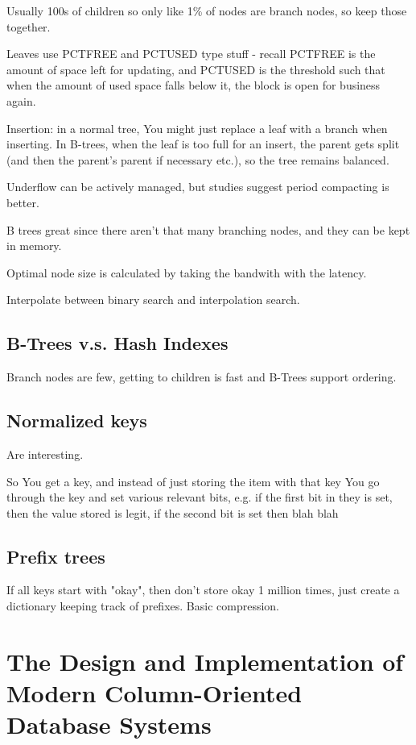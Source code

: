 \documentclass{article}
\begin{document}
	Usually 100s of children so only like 1\% of nodes are branch nodes, so keep those together.
	
	Leaves use PCTFREE and PCTUSED type stuff - recall PCTFREE is the amount of space left for updating, and PCTUSED is the threshold such that when the amount of used space falls below it, the block is open for business again.

	Insertion: in a normal tree, You might just replace a leaf with a branch when inserting. In B-trees, when the leaf is too full for an insert, the parent gets split (and then the parent's parent if necessary etc.), so the tree remains balanced.
	
	Underflow can be actively managed, but studies suggest period compacting is better.
	
	B trees great since there aren't that many branching nodes, and they can be kept in memory.
	
	Optimal node size is calculated by taking the bandwith with the latency.
	
	Interpolate between binary search and interpolation search.
	
	\subsection{B-Trees v.s. Hash Indexes}
	
		Branch nodes are few, getting to children is fast and B-Trees support ordering.
		
	\subsection{Normalized keys}
	
		Are interesting.
		
		So You get a key, and instead of just storing the item with that key You go through the key and set various relevant bits, e.g. if the first bit in they is set, then the value stored is legit, if the second bit is set then blah blah
		
	\subsection{Prefix trees}
	
		If all keys start with "okay", then don't store okay 1 million  times, just create a dictionary keeping track of prefixes. Basic compression.
		
\newpage
\section{The Design and Implementation of Modern Column-Oriented Database Systems}
\end{document}
